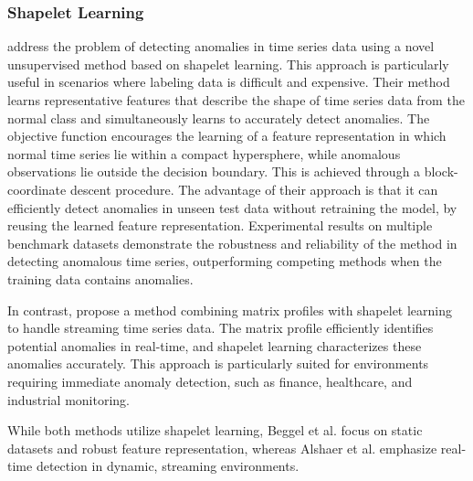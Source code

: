 \subsubsection{Shapelet Learning}
\cite{beggel_time_2019} address the problem of detecting anomalies in time series data using a novel unsupervised method based on shapelet learning. This approach is particularly useful in scenarios where labeling data is difficult and expensive.
Their method learns representative features that describe the shape of time series data from the normal class and simultaneously learns to accurately detect anomalies. The objective function encourages the learning of a feature representation in which normal time series lie within a compact hypersphere, while anomalous observations lie outside the decision boundary. This is achieved through a block-coordinate descent procedure.
The advantage of their approach is that it can efficiently detect anomalies in unseen test data without retraining the model, by reusing the learned feature representation. Experimental results on multiple benchmark datasets demonstrate the robustness and reliability of the method in detecting anomalous time series, outperforming competing methods when the training data contains anomalies.

In contrast, \cite{alshaer_detecting_2020} propose a method combining matrix profiles with shapelet learning to handle streaming time series data. The matrix profile efficiently identifies potential anomalies in real-time, and shapelet learning characterizes these anomalies accurately. This approach is particularly suited for environments requiring immediate anomaly detection, such as finance, healthcare, and industrial monitoring.

While both methods utilize shapelet learning, Beggel et al. focus on static datasets and robust feature representation, whereas Alshaer et al. emphasize real-time detection in dynamic, streaming environments.

\cite{liang_shapelet-based_2024}

\cite{li_ips_2022}

